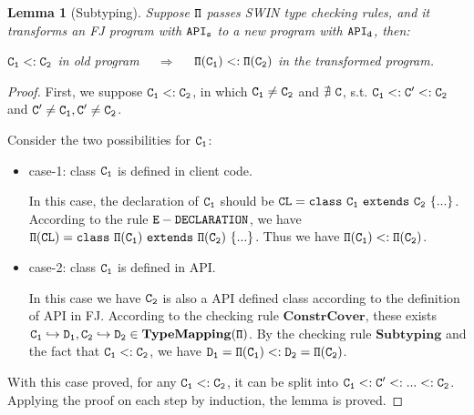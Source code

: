 \documentclass[letterpaper]{article}
\newtheorem{lemma}{Lemma}
\begin{document}
\begin{lemma}[Subtyping]
Suppose $\tt \Pi$ passes SWIN type checking rules, and it transforms an FJ program with $\tt API_s$ to a new program with $\tt API_d$, then:\par
$\tt C_1<: C_2 $ in old program ~~$\Longrightarrow$~~ $\tt\Pi(C_1)<:\Pi(C_2)$ in the transformed program.
\end{lemma}
\begin{proof}
First, we suppose $\tt C_1 <: C_2$, in which $\tt C_1 \neq C_2$ and $\tt\nexists~C$, s.t. $\tt C_1<:C'<:C_2$ and $\tt C'\neq C_1, C'\neq C_2$. 
 
Consider the two possibilities for $\tt C_1$:
\begin{itemize}
\item case-1: class $\tt C_1$ is defined in client code.

In this case, the declaration of $\tt C_1$ should be $\tt CL = class~C_1~extends~C_2~\{...\}$. According to the rule $\tt E-DECLARATION$, we have $\tt \Pi(CL)=class~\Pi(C_1)~extends~\Pi(C_2)~\{...\}$. Thus we have $\tt\Pi(C_1)<:\Pi(C_2)$.

\item case-2: class $\tt C_1$ is defined in API. 

In this case we have $\tt C_2$ is also a API defined class according to the definition of API in FJ. According to the checking rule $\mathbf{ConstrCover}$, these exists $\tt C_1\hookrightarrow D_1, C_2\hookrightarrow D_2 \in \mathbf{TypeMapping}(\Pi)$. By the checking rule $\mathbf{Subtyping}$ and the fact that $\tt C_1<:C_2$, we have $\tt D_1 = \Pi(C_1)<:D_2=\Pi(C_2)$.
\end{itemize}
With this case proved, for any $\tt C_1 <: C_2$, it can be split into $\tt C_1<: C' <: ... <: C_2$. Applying the proof on each step by induction, the lemma is proved.
\end{proof}
\end{document}
